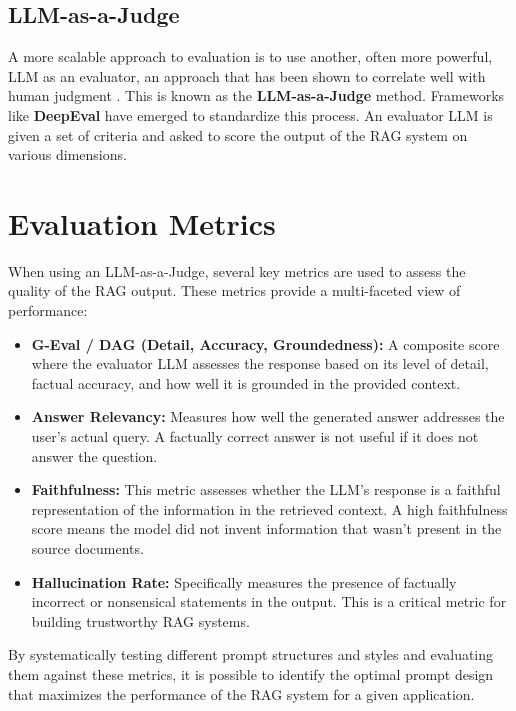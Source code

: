 \subsection{LLM-as-a-Judge}
A more scalable approach to evaluation is to use another, often more powerful, LLM as an evaluator, an approach that has been shown to correlate well with human judgment \autocite{zheng2023judging}. This is known as the \textbf{LLM-as-a-Judge} method. Frameworks like \textbf{DeepEval} have emerged to standardize this process. An evaluator LLM is given a set of criteria and asked to score the output of the RAG system on various dimensions.

\section{Evaluation Metrics}
When using an LLM-as-a-Judge, several key metrics are used to assess the quality of the RAG output. These metrics provide a multi-faceted view of performance:
\begin{itemize}
    \item \textbf{G-Eval / DAG (Detail, Accuracy, Groundedness):} A composite score where the evaluator LLM assesses the response based on its level of detail, factual accuracy, and how well it is grounded in the provided context.
    \item \textbf{Answer Relevancy:} Measures how well the generated answer addresses the user's actual query. A factually correct answer is not useful if it does not answer the question.
    \item \textbf{Faithfulness:} This metric assesses whether the LLM's response is a faithful representation of the information in the retrieved context. A high faithfulness score means the model did not invent information that wasn't present in the source documents.
    \item \textbf{Hallucination Rate:} Specifically measures the presence of factually incorrect or nonsensical statements in the output. This is a critical metric for building trustworthy RAG systems.
\end{itemize}

By systematically testing different prompt structures and styles and evaluating them against these metrics, it is possible to identify the optimal prompt design that maximizes the performance of the RAG system for a given application.